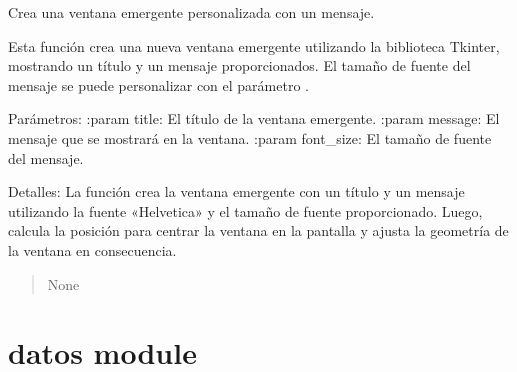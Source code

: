 \documentclass[letterpaper,10pt,spanish]{sphinxmanual}
\begin{document}
\begin{fulllineitems}
\label{\detokenize{custom_message_box:custom_message_box.custom_message_box}}
\pysigstartsignatures
{}
\pysigstopsignatures
\sphinxAtStartPar
Crea una ventana emergente personalizada con un mensaje.

\sphinxAtStartPar
Esta función crea una nueva ventana emergente utilizando la biblioteca Tkinter,
mostrando un título y un mensaje proporcionados. El tamaño de fuente del mensaje
se puede personalizar con el parámetro .

\sphinxAtStartPar
Parámetros:
:param title: El título de la ventana emergente.
:param message: El mensaje que se mostrará en la ventana.
:param font\_size: El tamaño de fuente del mensaje.

\sphinxAtStartPar
Detalles:
La función crea la ventana emergente con un título y un mensaje utilizando la
fuente «Helvetica» y el tamaño de fuente proporcionado. Luego, calcula la posición
para centrar la ventana en la pantalla y ajusta la geometría de la ventana en consecuencia.
\begin{quote}\begin{description}
\sphinxAtStartPar
None

\end{description}\end{quote}

\end{fulllineitems}


\sphinxstepscope


\chapter{datos module}
\label{\detokenize{datos:module-datos}}\label{\detokenize{datos:datos-module}}\label{\detokenize{datos::doc}}
\end{document}
